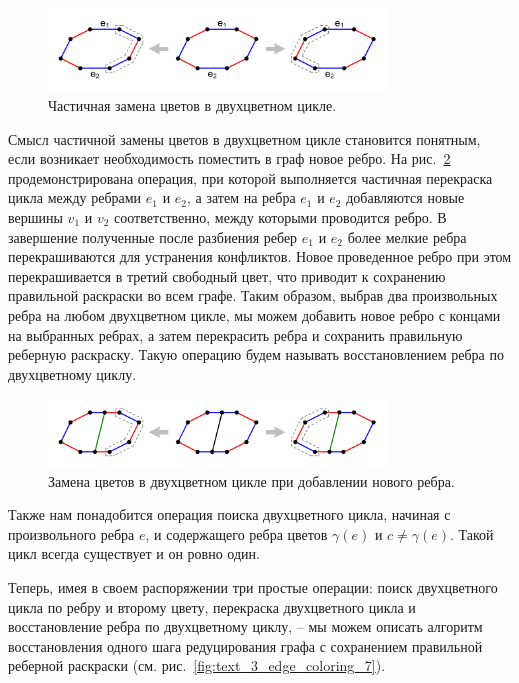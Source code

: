 \begin{figure}[ht]
\centering
\includegraphics[width=0.8\textwidth]{fig/par_edge_col_5-bicolor-cycle-partial-switch.pdf}
\singlespacing
{}\caption{Частичная замена цветов в двухцветном цикле.}
\label{fig:text_3_edge_coloring_5}
\end{figure}

Смысл частичной замены цветов в двухцветном цикле становится понятным, если возникает необходимость поместить в граф новое ребро.
На рис.~\ref{fig:text_3_edge_coloring_6} продемонстрирована операция, при которой выполняется частичная перекраска цикла между ребрами $e_1$ и $e_2$, а затем на ребра $e_1$ и $e_2$ добавляются новые вершины $v_1$ и $v_2$ соответственно, между которыми проводится ребро.
В завершение полученные после разбиения ребер $e_1$ и $e_2$ более мелкие ребра перекрашиваются для устранения конфликтов.
Новое проведенное ребро при этом перекрашивается в третий свободный цвет, что приводит к сохранению правильной раскраски во всем графе.
Таким образом, выбрав два произвольных ребра на любом двухцветном цикле, мы можем добавить новое ребро с концами на выбранных ребрах, а затем перекрасить ребра и сохранить правильную реберную раскраску.
Такую операцию будем называть восстановлением ребра по двухцветному циклу.

\begin{figure}[ht]
\centering
\includegraphics[width=0.8\textwidth]{fig/par_edge_col_6-bicolor-cycle-new-edge.pdf}
\singlespacing
{}\caption{Замена цветов в двухцветном цикле при добавлении нового ребра.}
\label{fig:text_3_edge_coloring_6}
\end{figure}

Также нам понадобится операция поиска двухцветного цикла, начиная с произвольного ребра $e$, и содержащего ребра цветов $\gamma(e)$ и $c \ne \gamma(e)$. Такой цикл всегда существует и он ровно один.

Теперь, имея в своем распоряжении три простые операции: поиск двухцветного цикла по ребру и второму цвету, перекраска двухцветного цикла и восстановление ребра по двухцветному циклу, -- мы можем описать алгоритм восстановления одного шага редуцирования графа с сохранением правильной реберной раскраски (см. рис.~\ref{fig:text_3_edge_coloring_7}).

